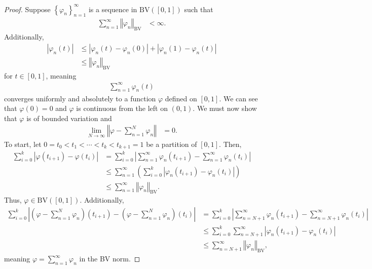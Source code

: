 \documentclass[10pt]{extarticle}
\newcommand{\norm}[1]{\left\Vert #1\right\Vert}
\newcommand{\set}[1]{\left\{#1\right\}}
\theoremstyle{plain}
\theoremstyle{definition}
\theoremstyle{note}
\begin{document}
\begin{proof}
  Suppose $\set{\varphi_n}_{n=1}^{\infty}$ is a sequence in $\text{BV}\left([0,1]\right)$ such that
  \begin{align*}
    \sum_{n=1}^{\infty}\norm{\varphi_n}_{\text{BV}} & < \infty.
  \end{align*}
  Additionally,
  \begin{align*}
    \left\vert \varphi_n(t) \right\vert &\leq \left\vert \varphi_n(t) - \varphi_n(0) \right\vert + \left\vert \varphi_n(1) - \varphi_n(t) \right\vert\\
                                        &\leq \norm{\varphi_n}_{\text{BV}}
  \end{align*}
  for $t\in [0,1]$, meaning
  \begin{align*}
    \sum_{n=1}^{\infty}\varphi_n(t)
  \end{align*}
  converges uniformly and absolutely to a function $\varphi$ defined on $[0,1]$. We can see that $\varphi(0) = 0$ and $\varphi$ is continuous from the left on $(0,1)$. We must now show that $\varphi$ is of bounded variation and
  \begin{align*}
    \lim_{N\rightarrow\infty}\norm{\varphi - \sum_{n=1}^{N}\varphi_n} &= 0.
  \end{align*}
  To start, let $0 = t_0 < t_1 < \cdots < t_k < t_{k+1} = 1$ be a partition of $[0,1]$. Then,
  \begin{align*}
    \sum_{i=0}^{k}\left\vert \varphi\left(t_{i+1}\right)- \varphi\left(t_i\right) \right\vert &= \sum_{i=0}^{k}\left\vert \sum_{n=1}^{\infty}\varphi_{n}(t_{i+1}) - \sum_{n=1}^{\infty}\varphi_n(t_i) \right\vert\\
                                                                                              &\leq \sum_{n=1}^{\infty}\left(\sum_{i=0}^{k}\left\vert \varphi_n(t_{i+1}) - \varphi_n(t_i) \right\vert\right)\\
                                                                                              &\leq \sum_{n=1}^{\infty}\norm{\varphi_n}_{\text{BV}}.
  \end{align*}
  Thus, $\varphi \in \text{BV}\left([0,1]\right)$. Additionally,
  \begin{align*}
    \sum_{i=0}^{k}\left\vert \left(\varphi - \sum_{n=1}^{N}\varphi_n\right)\left(t_{i+1}\right) - \left(\varphi - \sum_{n=1}^{N}\varphi_n\right)\left(t_i\right) \right\vert &= \sum_{i=0}^{k}\left\vert \sum_{n=N+1}^{\infty}\varphi_n\left(t_{i+1}\right) - \sum_{n=N+1}^{\infty}\varphi_n\left(t_{i}\right) \right\vert \\
                                                                                                                                                                                                 &\leq \sum_{i=0}^{k}\sum_{n=N+1}^{\infty}\left\vert \varphi_{n}\left(t_{i+1}\right)-\varphi_n\left(t_i\right) \right\vert\\
                                                                                                &\leq \sum_{n=N+1}^{\infty}\norm{\varphi_n}_{\text{BV}},
  \end{align*}
  meaning $\displaystyle\varphi = \sum_{n=1}^{\infty}\varphi_n$ in the BV norm.
\end{proof}
\end{document}
